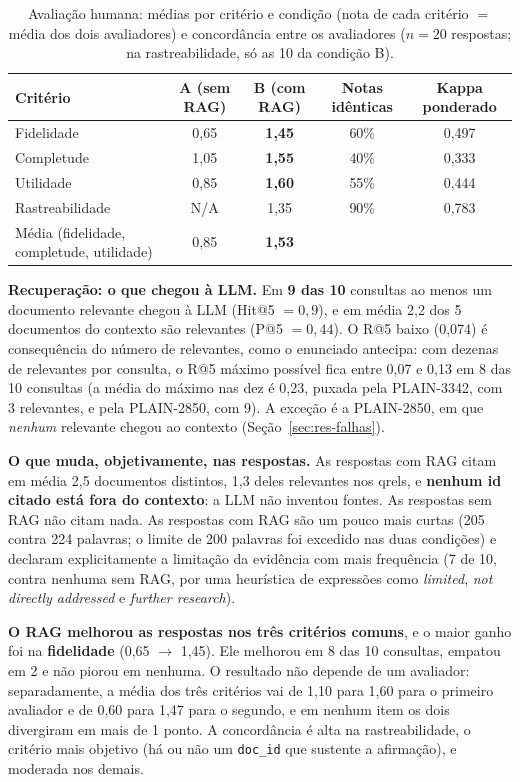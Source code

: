 \documentclass[10pt,a4paper]{article}
\newcommand{\pq}[1]{\mbox{PLAIN-#1}}        %
\begin{document}
\begin{table}[!htb]
\centering\small
\caption{Avaliação humana: médias por critério e condição (nota de cada critério $=$ média dos dois avaliadores) e concordância entre os avaliadores ($n = 20$ respostas; na rastreabilidade, só as 10 da condição B).}
\label{tab:ragnotas}
\begin{tabular}{@{}lcccc@{}}
\toprule
Critério & A (sem RAG) & B (com RAG) & Notas idênticas & Kappa ponderado \\
\midrule
Fidelidade      & 0,65 & \textbf{1,45} & 60\% & 0,497 \\
Completude      & 1,05 & \textbf{1,55} & 40\% & 0,333 \\
Utilidade       & 0,85 & \textbf{1,60} & 55\% & 0,444 \\
Rastreabilidade & N/A  & 1,35 & 90\% & 0,783 \\
\midrule
Média (fidelidade, completude, utilidade) & 0,85 & \textbf{1,53} & & \\
\bottomrule
\end{tabular}
\end{table}

\textbf{Recuperação: o que chegou à LLM.} Em \textbf{9 das 10} consultas ao menos um documento relevante chegou à LLM (Hit@5 $= 0{,}9$), e em média 2,2 dos 5 documentos do contexto são relevantes (P@5 $= 0{,}44$). O R@5 baixo (0,074) é consequência do número de relevantes, como o enunciado antecipa: com dezenas de relevantes por consulta, o R@5 máximo possível fica entre 0,07 e 0,13 em 8 das 10 consultas (a média do máximo nas dez é 0,23, puxada pela \pq{3342}, com 3 relevantes, e pela \pq{2850}, com 9). A exceção é a \pq{2850}, em que \emph{nenhum} relevante chegou ao contexto (Seção~\ref{sec:res-falhas}).

\textbf{O que muda, objetivamente, nas respostas.} As respostas com RAG citam em média 2,5 documentos distintos, 1,3 deles relevantes nos qrels, e \textbf{nenhum id citado está fora do contexto}: a LLM não inventou fontes. As respostas sem RAG não citam nada. As respostas com RAG são um pouco mais curtas (205 contra 224 palavras; o limite de 200 palavras foi excedido nas duas condições) e declaram explicitamente a limitação da evidência com mais frequência (7 de 10, contra nenhuma sem RAG, por uma heurística de expressões como \emph{limited}, \emph{not directly addressed} e \emph{further research}).

\textbf{O RAG melhorou as respostas nos três critérios comuns}, e o maior ganho foi na \textbf{fidelidade} (0,65 $\to$ 1,45). Ele melhorou em 8 das 10 consultas, empatou em 2 e não piorou em nenhuma. O resultado não depende de um avaliador: separadamente, a média dos três critérios vai de 1,10 para 1,60 para o primeiro avaliador e de 0,60 para 1,47 para o segundo, e em nenhum item os dois divergiram em mais de 1 ponto. A concordância é alta na rastreabilidade, o critério mais objetivo (há ou não um \texttt{doc\_id} que sustente a afirmação), e moderada nos demais.
\end{document}
